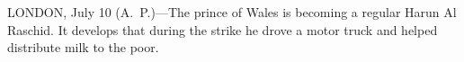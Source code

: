 
LONDON, July 10 (A.~P.)---The prince of Wales is becoming a regular
Harun Al Raschid.  It develops that during the strike he drove a motor
truck and helped distribute milk to the poor.
